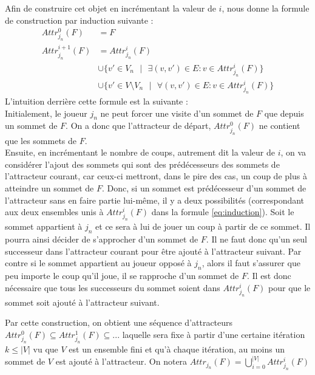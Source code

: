 \documentclass[12pt,a4paper,oneside,titlepage]{report}
\begin{document}
\noindent Afin de construire cet objet en incrémentant la valeur de $i$, \cite{Church} nous donne la formule de construction par induction suivante :
\begin{equation}
\label{eq:induction}
\begin{split}
Attr^0_{j_n}(F)&=F\\
Attr^{i+1}_{j_n}(F)&=Attr^i_{j_n}(F)\\
			&\cup \{v'\in V_n\text{ }|\text{ }\exists(v,v')\in E:v\in Attr^i_{j_n}(F)\}\\
			&\cup \{v'\in V\setminus V_n\text{ }|\text{ }\forall(v,v')\in E:v\in Attr^i_{j_n}(F)\}
\end{split}
\end{equation}
\noindent L'intuition derrière cette formule est la suivante :\\
Initialement, le joueur $j_n$ ne peut forcer une visite d'un sommet de $F$ que depuis un sommet de $F$. On a donc que l'attracteur de départ, $Attr^0_{j_n}(F)$ ne contient que les sommets de $F$.\\
Ensuite, en incrémentant le nombre de coups, autrement dit la valeur de $i$, on va considérer l'ajout des sommets qui sont des prédécesseurs des sommets de l'attracteur courant, car ceux-ci mettront, dans le pire des cas, un coup de plus à atteindre un sommet de $F$. Donc, si un sommet est prédécesseur d'un sommet de l'attracteur sans en faire partie lui-même, il y a deux possibilités (correspondant aux deux ensembles unis à $Attr^i_{j_n}(F)$ dans la formule \ref{eq:induction}). Soit le sommet appartient à $j_n$ et ce sera à lui de jouer un coup à partir de ce sommet. Il pourra ainsi décider de s'approcher d'un sommet de $F$. Il ne faut donc qu'un seul successeur dans l'attracteur courant pour être ajouté à l'attracteur suivant. Par contre si le sommet appartient au joueur opposé à $j_n$, alors il faut s'assurer que peu importe le coup qu'il joue, il se rapproche d'un sommet de $F$. Il est donc nécessaire que tous les successeurs du sommet soient dans $Attr^i_{j_n}(F)$ pour que le sommet soit ajouté à l'attracteur suivant.


Par cette construction, on obtient une séquence d'attracteurs $Attr_{j_n}^0(F)\subseteq Attr_{j_n}^1(F) \subseteq ...$ laquelle sera fixe à partir d'une certaine itération $k\leq|V|$ vu que $V$ est un ensemble fini et qu'à chaque itération, au moins un sommet de $V$ est ajouté à l'attracteur. On notera $Attr_{j_n}(F)=\bigcup_{i=0}^{|V|}Attr_{j_n}^i(F)$
\end{document}
